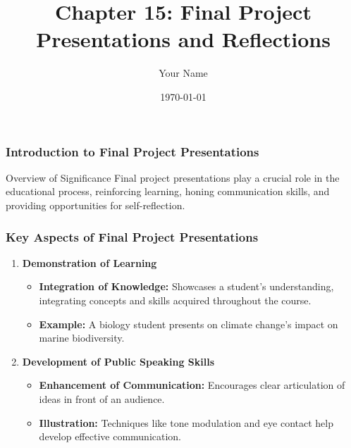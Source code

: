 \documentclass{beamer}
\title{Chapter 15: Final Project Presentations and Reflections}
\author{Your Name}
\institute{Your Institution}
\date{\today}
\begin{document}
\frame{\titlepage}

\begin{frame}[fragile]
    \frametitle{Introduction to Final Project Presentations}
    \begin{block}{Overview of Significance}
        Final project presentations play a crucial role in the educational process, reinforcing learning, honing communication skills, and providing opportunities for self-reflection.
    \end{block}
\end{frame}

\begin{frame}[fragile]
    \frametitle{Key Aspects of Final Project Presentations}
    \begin{enumerate}
        \item \textbf{Demonstration of Learning}
        \begin{itemize}
            \item \textbf{Integration of Knowledge:} Showcases a student’s understanding, integrating concepts and skills acquired throughout the course.
            \item \textbf{Example:} A biology student presents on climate change's impact on marine biodiversity.
        \end{itemize}

        \item \textbf{Development of Public Speaking Skills}
        \begin{itemize}
            \item \textbf{Enhancement of Communication:} Encourages clear articulation of ideas in front of an audience.
            \item \textbf{Illustration:} Techniques like tone modulation and eye contact help develop effective communication.
        \end{itemize}
    \end{enumerate}
\end{frame}
\end{document}
